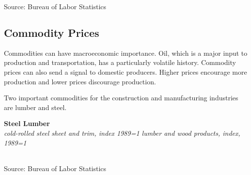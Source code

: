 \documentclass{report}
\makeatletter
\newcommand{\tbllink}[1]{\href{https://raw.githubusercontent.com/bdecon/US-chartbook/master/chartbook/data/#1}{\faTable}}
\newcommand*\short[1]{\expandafter\@gobbletwo\number\numexpr#1\relax}
\newcommand{\shdateaxisticks}{
		date coordinates in=x, axis line style={draw=none},
		xmax={2023-11-01},
		max space between ticks=40,	    
		xtick={{1990-01-01}, {1995-01-01}, {2000-01-01}, 
			{2005-01-01}, {2010-01-01}, {2015-01-01}, {2020-01-01}},
		minor xtick={},
		enlarge y limits={0.06}, enlarge x limits={0.01},
		}
\newcommand{\bbar}[2]{extra #1 ticks = {{#2}}, extra #1 tick labels = ,
		extra #1 tick style = {grid=major, grid style={thick, black!25}},}
\newcommand{\stdline}[4]{\addplot[very thick, no markers, color=#1] 
		table [x=#2, y=#3, col sep=comma] {#4};	}
\newcommand{\rbars}{
		\fill[color=black!10] (axis cs:{1990-07-01},\pgfkeysvalueof{/pgfplots/ymin}) rectangle 
			(axis cs:{1991-03-01}, \pgfkeysvalueof{/pgfplots/ymax});
		\fill[color=black!10] (axis cs:{2007-12-01},\pgfkeysvalueof{/pgfplots/ymin}) rectangle 
			(axis cs:{2009-07-01}, \pgfkeysvalueof{/pgfplots/ymax});
		\fill[color=black!10] (axis cs:{2001-03-01},\pgfkeysvalueof{/pgfplots/ymin}) rectangle 
			(axis cs:{2001-11-01}, \pgfkeysvalueof{/pgfplots/ymax});
		\fill[color=black!10] (axis cs:{2020-02-01},\pgfkeysvalueof{/pgfplots/ymin}) rectangle 
			(axis cs:{2020-05-01}, \pgfkeysvalueof{/pgfplots/ymax});}
\makeatother
\begin{document}
{{\begin{minipage}{0.76\textwidth}
\footnotesize{Source: Bureau of Labor Statistics} \hfill \tbllink{mxpi.csv}
\vspace{2mm}

\hypertarget{prco}{\label{prco}}
\subsection*{Commodity Prices}
\vspace*{-1mm}

\small Commodities can have macroeconomic importance. Oil, which is a major input to production and transportation, has a particularly volatile history. Commodity prices can also send a signal to domestic producers. Higher prices encourage more production and lower prices discourage production. 

Two important commodities for the construction and manufacturing industries are lumber and steel.  
 
\vspace{1mm}

\normalsize \textbf{Steel \hspace{5.5cm} Lumber}\\
\footnotesize{\textit{cold-rolled steel sheet and trim, index 1989=1 \hspace{9mm} lumber and wood products, index, 1989=1}}\\
\hspace*{-2mm}  \hfill {}\\
\footnotesize{Source: Bureau of Labor Statistics} \hfill \tbllink{ppi_commodities.csv}
\end{minipage}
\newpage
\vspace*{-10mm}

}}
\end{document}
